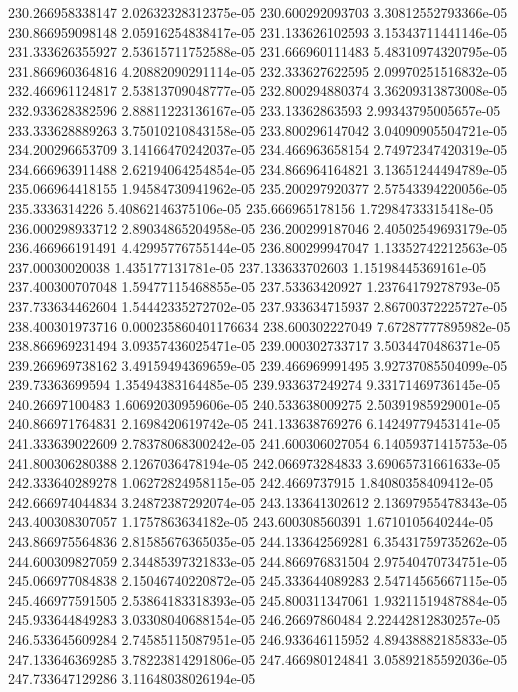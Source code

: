 {230.266958338147 2.02632328312375e-05
230.600292093703 3.30812552793366e-05
230.866959098148 2.05916254838417e-05
231.133626102593 3.15343711441146e-05
231.333626355927 2.53615711752588e-05
231.666960111483 5.48310974320795e-05
231.866960364816 4.20882090291114e-05
232.333627622595 2.09970251516832e-05
232.466961124817 2.53813709048777e-05
232.800294880374 3.36209313873008e-05
232.933628382596 2.88811223136167e-05
233.13362863593 2.99343795005657e-05
233.333628889263 3.75010210843158e-05
233.800296147042 3.04090905504721e-05
234.200296653709 3.14166470242037e-05
234.466963658154 2.74972347420319e-05
234.666963911488 2.62194064254854e-05
234.866964164821 3.13651244494789e-05
235.066964418155 1.94584730941962e-05
235.200297920377 2.57543394220056e-05
235.3336314226 5.40862146375106e-05
235.666965178156 1.72984733315418e-05
236.000298933712 2.89034865204958e-05
236.200299187046 2.40502549693179e-05
236.466966191491 4.42995776755144e-05
236.800299947047 1.13352742212563e-05
237.00030020038 1.435177131781e-05
237.133633702603 1.15198445369161e-05
237.400300707048 1.59477115468855e-05
237.53363420927 1.23764179278793e-05
237.733634462604 1.54442335272702e-05
237.933634715937 2.86700372225727e-05
238.400301973716 0.000235860401176634
238.600302227049 7.67287777895982e-05
238.866969231494 3.09357436025471e-05
239.000302733717 3.5034470486371e-05
239.266969738162 3.49159494369659e-05
239.466969991495 3.92737085504099e-05
239.73363699594 1.35494383164485e-05
239.933637249274 9.33171469736145e-05
240.26697100483 1.60692030959606e-05
240.533638009275 2.50391985929001e-05
240.866971764831 2.1698420619742e-05
241.133638769276 6.14249779453141e-05
241.333639022609 2.78378068300242e-05
241.600306027054 6.14059371415753e-05
241.800306280388 2.1267036478194e-05
242.066973284833 3.69065731661633e-05
242.333640289278 1.06272824958115e-05
242.4669737915 1.84080358409412e-05
242.666974044834 3.24872387292074e-05
243.133641302612 2.13697955478343e-05
243.400308307057 1.1757863634182e-05
243.600308560391 1.6710105640244e-05
243.866975564836 2.81585676365035e-05
244.133642569281 6.35431759735262e-05
244.600309827059 2.34485397321833e-05
244.866976831504 2.97540470734751e-05
245.066977084838 2.15046740220872e-05
245.333644089283 2.54714565667115e-05
245.466977591505 2.53864183318393e-05
245.800311347061 1.93211519487884e-05
245.933644849283 3.03308040688154e-05
246.26697860484 2.22442812830257e-05
246.533645609284 2.74585115087951e-05
246.933646115952 4.89438882185833e-05
247.133646369285 3.78223814291806e-05
247.466980124841 3.05892185592036e-05
247.733647129286 3.11648038026194e-05
}
